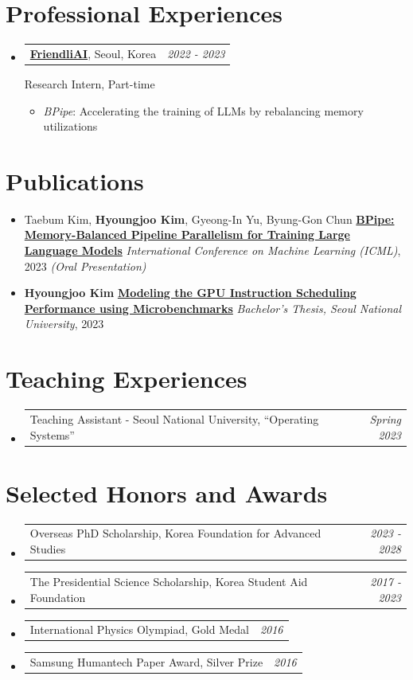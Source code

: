 \documentclass[a4paper]{article}
\makeatletter
\newcommand{\resumeSubheading}[4]{
  \vspace{-1pt}\item
    \begin{tabular*}{0.97\textwidth}{l@{\extracolsep{\fill}}r}
      \textbf{#1}, #2 & \textit{#3} \\
    \end{tabular*}
    #4
}
\newcommand{\resumeSubheadingSimple}[2]{
  \vspace{-1pt}\item
	\begin{tabular*}{0.97\textwidth}{l@{\extracolsep{\fill}}r}
	  #1 & \textit{#2} \\
	\end{tabular*}
  \vspace{-5pt}
}
\newcommand{\resumeSubheadingItem}[1]{
  \vspace{0pt}\item #1
  \vspace{0pt}
}
\newcommand{\resumeSubHeadingListStart}{\begin{itemize}[leftmargin=*]}
\newcommand{\resumeSubHeadingListEnd}{\end{itemize}}
\makeatother
\begin{document}
\section{Professional Experiences}
\resumeSubHeadingListStart
	\resumeSubheading
		{\href{https://friendli.ai}{FriendliAI}}{Seoul, Korea}
		{2022 - 2023}
		{
			Research Intern, Part-time
			\vspace{-5pt}
			\begin{itemize}
				\item {\textit{BPipe}: Accelerating the training of LLMs by rebalancing memory utilizations}
			\end{itemize}
		}
\resumeSubHeadingListEnd

\section{Publications}
\resumeSubHeadingListStart
	\resumeSubheadingItem{
		Taebum Kim, \textbf{Hyoungjoo Kim}, Gyeong-In Yu, Byung-Gon Chun \newline
		\href{https://openreview.net/forum?id=HVKmLi1iR4}{\textbf{BPipe: Memory-Balanced Pipeline Parallelism for Training Large Language Models}} \newline
		\textit{International Conference on Machine Learning (ICML)}, 2023 \textit{(Oral Presentation)}
	}
	\resumeSubheadingItem{
		\textbf{Hyoungjoo Kim} \newline
		\href{https://snu-primo.hosted.exlibrisgroup.com/permalink/f/1qb4pk8/82SNU_INST21903413170002591}{\textbf{Modeling the GPU Instruction Scheduling Performance using Microbenchmarks}} \newline
		\textit{Bachelor's Thesis, Seoul National University}, 2023
	}

\resumeSubHeadingListEnd

\section{Teaching Experiences}
\resumeSubHeadingListStart
	\resumeSubheadingSimple{
		Teaching Assistant - Seoul National University, ``Operating Systems''
	}{Spring 2023}
\resumeSubHeadingListEnd

\section{Selected Honors and Awards}
\resumeSubHeadingListStart
\resumeSubheadingSimple{
	Overseas PhD Scholarship, Korea Foundation for Advanced Studies
}{2023 - 2028}
\resumeSubheadingSimple{
	The Presidential Science Scholarship, Korea Student Aid Foundation
}{2017 - 2023}
\resumeSubheadingSimple{
	International Physics Olympiad, Gold Medal
}{2016}
\resumeSubheadingSimple{
	Samsung Humantech Paper Award, Silver Prize
}{2016}
\resumeSubHeadingListEnd
\end{document}
